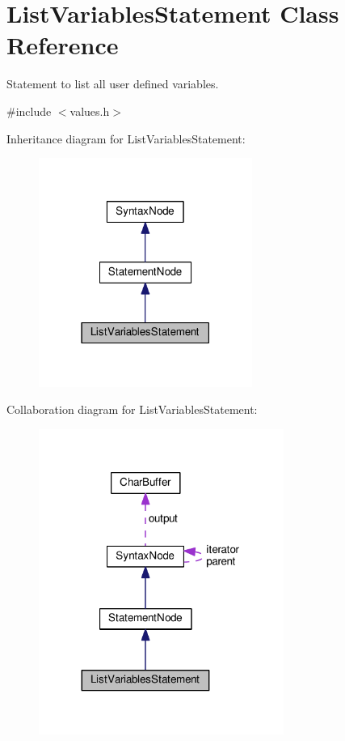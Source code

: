 \hypertarget{classListVariablesStatement}{}\section{List\+Variables\+Statement Class Reference}
\label{classListVariablesStatement}


Statement to list all user defined variables.  




{\ttfamily \#include $<$values.\+h$>$}



Inheritance diagram for List\+Variables\+Statement\+:\nopagebreak
\begin{figure}[H]
\begin{center}
\leavevmode
\includegraphics[width=198pt]{classListVariablesStatement__inherit__graph}
\end{center}
\end{figure}


Collaboration diagram for List\+Variables\+Statement\+:\nopagebreak
\begin{figure}[H]
\begin{center}
\leavevmode
\includegraphics[width=227pt]{classListVariablesStatement__coll__graph}
\end{center}
\end{figure}

